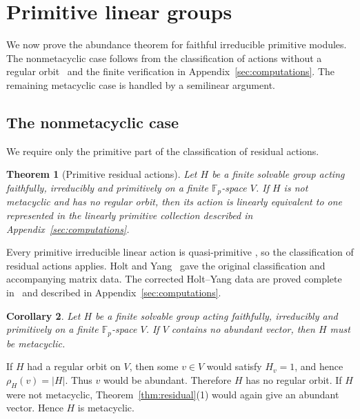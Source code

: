 \documentclass[10pt]{amsart}
\newtheorem{theorem}{Theorem}[section]
\newtheorem{corollary}[theorem]{Corollary}
\theoremstyle{definition}
\let\oldendproof\endproof
\renewenvironment{proof}[1][\proofname]{%
  \oldproof[\bfseries #1]%
}{\oldendproof}
\numberwithin{equation}{section}
\numberwithin{table}{section}
\begin{document}
\section{Primitive linear groups}
\label{sec:primitive}

We now prove the abundance theorem for faithful irreducible primitive
modules. The nonmetacyclic case follows from the classification of actions
without a regular orbit~\cite{HY23} and the finite verification in
Appendix~\ref{sec:computations}. The remaining metacyclic case is handled by
a semilinear argument.

\subsection{The nonmetacyclic case}

We require only the primitive part of the classification of residual actions.

\begin{theorem}[Primitive residual actions]
\label{thm:residual-classification}
Let $H$ be a finite solvable group acting faithfully, irreducibly and
primitively on a finite $\mathbb{F}_p$-space $V$. If $H$ is not
metacyclic and has no regular orbit, then its action is linearly equivalent
to one represented in the linearly primitive collection described in
Appendix~\ref{sec:computations}.
\end{theorem}

\begin{proof}
Every primitive irreducible linear action is quasi-primitive
\cite[p.~27]{ManzWolf93}, so the classification of residual actions applies.
Holt and Yang~\cite{HY23} gave the original classification and accompanying
matrix data. The corrected Holt--Yang data are proved complete
in~\cite{ZhangRegularOrbits26} and described in
Appendix~\ref{sec:computations}.
\end{proof}

\begin{corollary}\label{cor:primitive-metacyclic}
Let $H$ be a finite solvable group acting faithfully, irreducibly and
primitively on a finite $\mathbb{F}_p$-space $V$. If $V$ contains no
abundant vector, then $H$ must be metacyclic.
\end{corollary}

\begin{proof}
If $H$ had a regular orbit on $V$, then some $v\in V$ would satisfy
$H_v=1$, and hence $\rho_H(v)=|H|$. Thus $v$ would be abundant. Therefore
$H$ has no regular orbit. If $H$ were not metacyclic,
Theorem~\ref{thm:residual}\textup{(1)} would again give an abundant vector.
Hence $H$ is metacyclic.
\end{proof}
\end{document}
